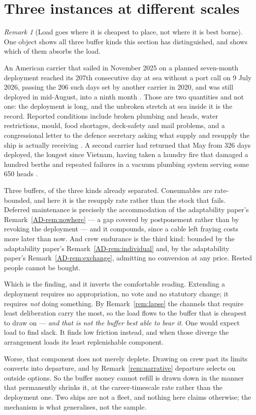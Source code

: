 \documentclass[11pt,a4paper]{article}
\theoremstyle{remark}
\newtheorem{remark}[definition]{Remark}
\begin{document}
\section{Three instances at different scales}\label{sec:instances}
\begin{remark}[Load goes where it is cheapest to place, not where it is best borne]\label{rem:load}
One object shows all three buffer kinds this section has distinguished, and shows which of them absorbs
the load.

An American carrier that sailed in November 2025 on a planned seven-month deployment reached its 207th
consecutive day at sea without a port call on 9 July 2026, passing the 206 such days set by another
carrier in 2020, and was still deployed in mid-August, into a ninth month \citep{lincoln2026}. Those are
two quantities and not one: the deployment is long, and the unbroken stretch at sea inside it is the
record. Reported conditions include broken plumbing and heads, water restrictions, mould, food
shortages, deck-safety and mail problems, and a congressional letter to the defence secretary asking
what supply and resupply the ship is actually receiving \citep{navy2026,navy2026b}. A second carrier had
returned that May from 326 days deployed, the longest since Vietnam, having taken a laundry fire that
damaged a hundred berths and repeated failures in a vacuum plumbing system serving some 650 heads
\citep{ford2026,ford2026b}.

Three buffers, of the three kinds already separated. Consumables are rate-bounded, and here it is
the resupply rate rather than the stock that fails. Deferred maintenance is precisely
the accommodation of the adaptability paper's Remark~\ref{AD-rem:nowhere} --- a gap covered by postponement rather than by revoking the
deployment --- and it compounds, since a cable left fraying costs more later than now. And crew
endurance is the third kind: bounded by the adaptability paper's Remark~\ref{AD-rem:individual} and, by the adaptability paper's Remark~\ref{AD-rem:exchange},
admitting no conversion at any price. Rested people cannot be bought.

Which is the finding, and it inverts the comfortable reading. Extending a deployment requires no
appropriation, no vote and no statutory change; it requires \emph{not} doing something. By
Remark~\ref{rem:lapse} the channels that require least deliberation carry the most, so the load flows to
the buffer that is cheapest to draw on --- \emph{and that is not the buffer best able to bear it}. One
would expect load to find slack. It finds low friction instead, and when those diverge the arrangement
loads its least replenishable component.

Worse, that component does not merely deplete. Drawing on crew past its limits converts into
departure, and by Remark~\ref{rem:narrative} departure selects on outside options. So the buffer
money cannot refill is drawn down in the manner that permanently shrinks it, at the career-timescale
rate rather than the deployment one. Two ships are not a fleet, and nothing here claims otherwise; the
mechanism is what generalises, not the sample.
\end{remark}
\end{document}
